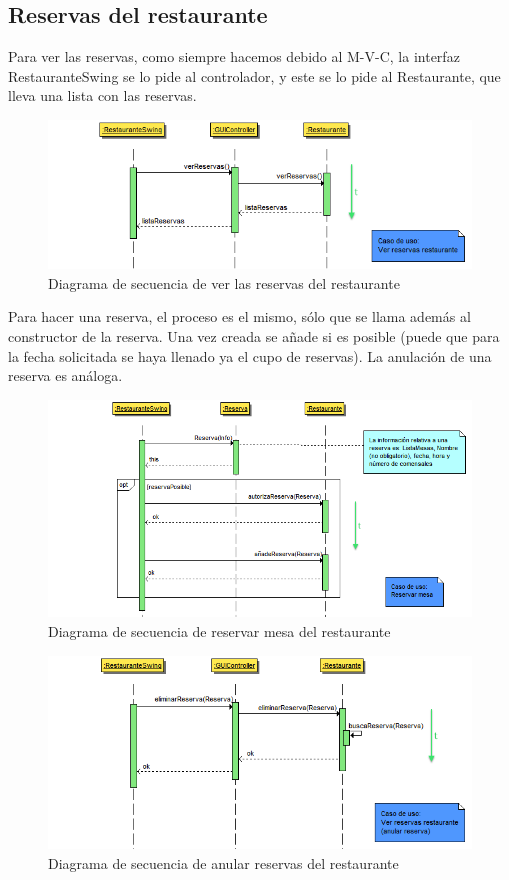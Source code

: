 \documentclass[spanish,a4paper,11pt, twoside]{report}	%
\begin{document}
		\subsection{Reservas del restaurante}
		Para ver las reservas,  como siempre hacemos debido al M-V-C, la interfaz RestauranteSwing se lo pide al controlador, y este se lo pide al Restaurante, que lleva una lista con las reservas.
		\begin{figure}[!h]
		\centering
		\includegraphics[scale=0.6]{DSverreservas.png}
		\caption{Diagrama de secuencia de ver las reservas del restaurante}
		\end{figure}

		Para hacer una reserva, el proceso es el mismo, sólo que se llama además al constructor de la reserva. Una vez creada se añade si es posible (puede que para la fecha solicitada se haya llenado ya el cupo de reservas). La anulación de una reserva es análoga.
		\begin{figure}[!h]
		\centering
		\includegraphics[scale=0.6]{DSreservarmesa.png}
		\caption{Diagrama de secuencia de reservar mesa del restaurante}
		\end{figure}

		\begin{figure}[!h]
		\centering
		\includegraphics[scale=0.6]{DSanularreserva.png}
		\caption{Diagrama de secuencia de anular reservas del restaurante}
		\end{figure}
\end{document}
